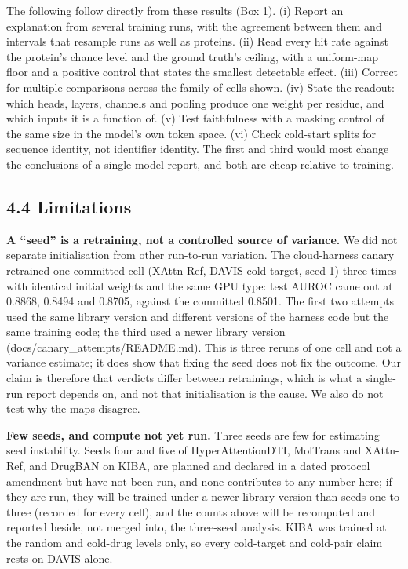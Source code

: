 The following follow directly from these results (Box 1). (i) Report an explanation from several training runs, with the agreement between them and intervals that resample runs as well as proteins. (ii) Read every hit rate against the protein's chance level and the ground truth's ceiling, with a uniform-map floor and a positive control that states the smallest detectable effect. (iii) Correct for multiple comparisons across the family of cells shown. (iv) State the readout: which heads, layers, channels and pooling produce one weight per residue, and which inputs it is a function of. (v) Test faithfulness with a masking control of the same size in the model's own token space. (vi) Check cold-start splits for sequence identity, not identifier identity. The first and third would most change the conclusions of a single-model report, and both are cheap relative to training.

\subsection{4.4 Limitations}\label{limitations}

\textbf{A ``seed'' is a retraining, not a controlled source of variance.} We did not separate initialisation from other run-to-run variation. The cloud-harness canary retrained one committed cell (XAttn-Ref, DAVIS cold-target, seed 1) three times with identical initial weights and the same GPU type: test AUROC came out at 0.8868, 0.8494 and 0.8705, against the committed 0.8501. The first two attempts used the same library version and different versions of the harness code but the same training code; the third used a newer library version (docs/canary\_attempts/README.md). This is three reruns of one cell and not a variance estimate; it does show that fixing the seed does not fix the outcome. Our claim is therefore that verdicts differ between retrainings, which is what a single-run report depends on, and not that initialisation is the cause. We also do not test why the maps disagree.

\textbf{Few seeds, and compute not yet run.} Three seeds are few for estimating seed instability. Seeds four and five of HyperAttentionDTI, MolTrans and XAttn-Ref, and DrugBAN on KIBA, are planned and declared in a dated protocol amendment but have not been run, and none contributes to any number here; if they are run, they will be trained under a newer library version than seeds one to three (recorded for every cell), and the counts above will be recomputed and reported beside, not merged into, the three-seed analysis. KIBA was trained at the random and cold-drug levels only, so every cold-target and cold-pair claim rests on DAVIS alone.

